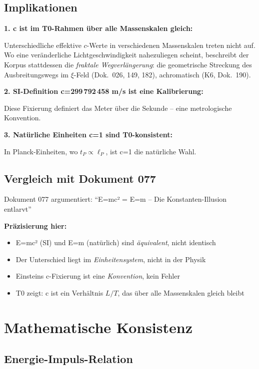 	\subsection{Implikationen}
	
	\textbf{1. c ist im T0-Rahmen über alle Massenskalen gleich:}
	
	Unterschiedliche effektive $c$-Werte in verschiedenen Massenskalen treten nicht auf. Wo eine veränderliche Lichtgeschwindigkeit nahezuliegen scheint, beschreibt der Korpus stattdessen die \emph{fraktale Wegverlängerung}: die geometrische Streckung des Ausbreitungswegs im $\xi$-Feld (Dok.~026, 149, 182), achromatisch (K6, Dok.~190).
	
	\textbf{2. SI-Definition c=299\,792\,458 m/s ist eine Kalibrierung:}
	
	Diese Fixierung definiert das Meter über die Sekunde -- eine metrologische Konvention.
	
	\textbf{3. Natürliche Einheiten c=1 sind T0-konsistent:}
	
	In Planck-Einheiten, wo $t_P \propto \ell_P$, ist c=1 die natürliche Wahl.
	
	\subsection{Vergleich mit Dokument 077}
	
	Dokument 077 argumentiert: ``E=mc² = E=m -- Die Konstanten-Illusion entlarvt''
	
	\textbf{Präzisierung hier:}
	\begin{itemize}
		\item E=mc² (SI) und E=m (natürlich) sind \emph{äquivalent}, nicht identisch
		\item Der Unterschied liegt im \emph{Einheitensystem}, nicht in der Physik
		\item Einsteins c-Fixierung ist eine \emph{Konvention}, kein Fehler
		\item T0 zeigt: c ist ein Verhältnis $L/T$, das über alle Massenskalen gleich bleibt
	\end{itemize}
	
	\section{Mathematische Konsistenz}
	
	\subsection{Energie-Impuls-Relation}
	
